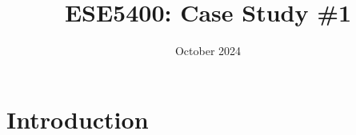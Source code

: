 \documentclass{article}
\title{ESE5400: Case Study \#1}
\author{}
\date{October 2024}
\begin{document}
\maketitle

\section{Introduction}
\end{document}
